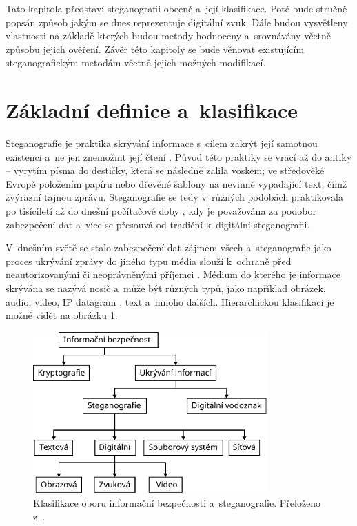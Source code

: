 Tato kapitola představí steganografii obecně a~její klasifikace. Poté bude
stručně popsán způsob jakým se dnes reprezentuje digitální zvuk. Dále budou
vysvětleny vlastnosti na základě kterých budou metody hodnoceny a~srovnávány
včetně způsobu jejich ověření. Závěr této kapitoly se bude věnovat existujícím
steganografickým metodám včetně jejich možných modifikací.

\section{Základní definice a~klasifikace}
\label{sec:definitions}

Steganografie je praktika skrývání informace s~cílem zakrýt její samotnou
existenci a~ne jen znemožnit její čtení
\cite{AlSabhany2020}\cite{Anderson1998}\cite{Djebbar2012}\cite{Dutta2020}.
Původ této praktiky se vrací až do antiky -- vyrytím písma do destičky, která
se následně zalila voskem; ve středověké Evropě položením papíru nebo dřevěné
šablony na nevinně vypadající text, čímž zvýrazní tajnou zprávu. Steganografie
se tedy v~různých podobách praktikovala po tisíciletí až do dnešní počítačové
doby \cite{Anderson1998}, kdy je považována za podobor zabezpečení dat
\cite{Djebbar2012} a~více se přesouvá od tradiční k~digitální steganografii.

V~dnešním světě se stalo zabezpečení dat zájmem všech a~steganografie jako
proces ukrývání zprávy do jiného typu média slouží k~ochraně před
neautorizovanými či neoprávněnými příjemci \cite{Dutta2020}. Médium do kterého
je informace skrývána se nazývá nosič a~může být různých typů, jako například
obrázek, audio, video, IP datagram \cite{Dutta2020}, text a~mnoho dalších.
Hierarchickou klasifikaci je možné vidět na obrázku
\ref{pic:steganography-classification}.

\begin{figure}[hbt]
    \centering
    \includegraphics[width=0.8\textwidth]{obrazky/steganography-classification.pdf}
    \caption{Klasifikace oboru informační bezpečnosti a~steganografie.
    Přeloženo z~\cite{Elshoush2022}.}
    \label{pic:steganography-classification}
\end{figure}

